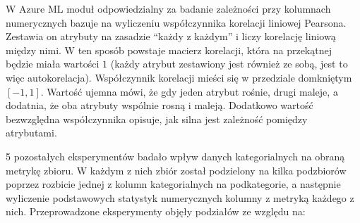W Azure ML moduł odpowiedzialny za badanie zależności przy kolumnach numerycznych bazuje na wyliczeniu współczynnika korelacji liniowej Pearsona.
Zestawia on atrybuty na zasadzie ``każdy z każdym'' i liczy korelację liniową między nimi.
W ten sposób powstaje macierz korelacji, która na przekątnej będzie miała wartości \( 1 \) (każdy atrybut zestawiony jest również ze sobą, jest to więc autokorelacja).
Współczynnik korelacji mieści się w przedziale domkniętym \( [-1, 1] \).
Wartość ujemna mówi, że gdy jeden atrybut rośnie, drugi maleje, a dodatnia, że oba atrybuty wspólnie rosną i maleją.
Dodatkowo wartość bezwzględna współczynnika opisuje, jak silna jest zależność pomiędzy atrybutami.

5 pozostałych eksperymentów badało wpływ danych kategorialnych na obraną metrykę zbioru.
W każdym z nich zbiór został podzielony na kilka podzbiorów poprzez rozbicie jednej z kolumn kategorialnych na podkategorie, a następnie wyliczenie podstawowych statystyk numerycznych kolumny z metryką każdego z nich.
Przeprowadzone eksperymenty objęły podziałów ze względu na:

